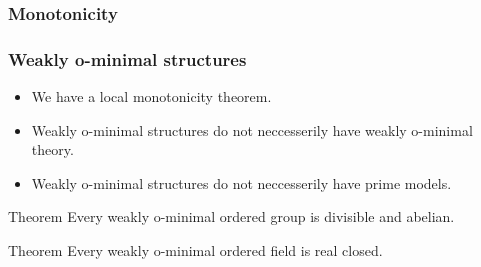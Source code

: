 \begin{frame}[t]\frametitle{Monotonicity}

\end{frame}

\begin{frame}[t]\frametitle{Weakly o-minimal structures}

    
	\begin{itemize}
		\item[$\color{darkred}\bigstar$] We have a local monotonicity theorem. \citep{arefiev1997monotonicity}
		\item[$\color{darkred}\bigstar$] Weakly o-minimal structures do not neccesserily have weakly o-minimal theory.
		\item[$\color{darkred}\bigstar$] Weakly o-minimal structures do not neccesserily have prime models.
	\end{itemize}

	\begin{beamerboxesrounded}[shadow=true]{Theorem \citep{macpherson2000weakly}}
		Every weakly o-minimal ordered group is divisible and abelian.
	\end{beamerboxesrounded}

	\begin{beamerboxesrounded}[shadow=true]{Theorem \citep{macpherson2000weakly}}
		Every weakly o-minimal ordered field is real closed.
	\end{beamerboxesrounded}
\end{frame}

